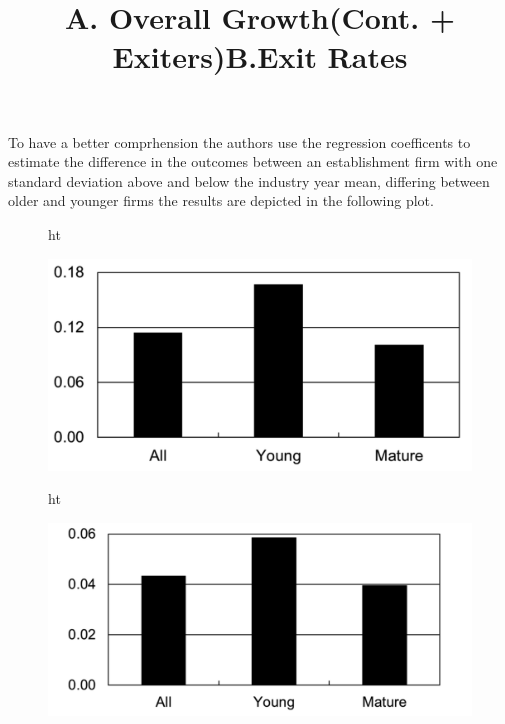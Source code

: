 \documentclass[12pt]{article}
\begin{document}
To have a better comprhension the authors use the regression coefficents to estimate the difference in the outcomes
between an establishment firm with one standard deviation above and below the industry year mean, differing between
older and younger firms the results are depicted in the following plot.
\begin{figure}{ht}
    \centering
    \title{A. Overall Growth(Cont. + Exiters)}
    \includegraphics[scale = 0.35]{Plot1.3.png}
    
    \label{plot:1.3}
\end{figure} 
\begin{figure}{ht}
    \centering
    \title{B.Exit Rates}
    \includegraphics[scale = 0.35]{Plot1.4.png}
    
    \label{plot:1.3}
\end{figure} 
\end{document}
